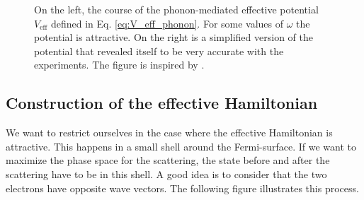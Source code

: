 \documentclass[../main.tex]{subfile}
\begin{document}
\begin{figure}[H]
        \caption{On the left, the course of the phonon-mediated effective potential $V_{\text{eff}}$ defined in Eq. \ref{eq:V_eff_phonon}. For some values of $\omega$ the potential is attractive.
        On the right is a simplified version of the potential that revealed itself to be very accurate with the experiments. The figure is inspired by \cite{FossheimSudbo2004}.}
    \end{figure}
\subsection{Construction of the effective Hamiltonian}
We want to restrict ourselves in the case where the effective Hamiltonian is attractive. This happens in a small shell around the Fermi-surface.
If we want to maximize the phase space for the scattering, the state before and after the scattering have to be in this shell. A good idea is 
to consider that the two electrons have opposite wave vectors. The following figure illustrates this process.
\end{document}
